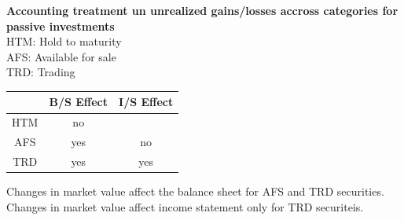 \textbf{Accounting treatment un unrealized gains/losses accross categories for passive investments}
\\
HTM: Hold to maturity \\
AFS: Available for sale \\
TRD: Trading \\
\begin{center}
	\begin{tabular}{ |c|c|c| } 
		\hline
			  & B/S Effect & I/S Effect \\ 
		\hline
		HTM & no &  \\ 
		AFS & yes & no \\ 
		TRD & yes & yes \\ 
		\hline
	\end{tabular}
\end{center}

Changes in market value affect the balance sheet for AFS and TRD securities. Changes in market value affect income statement only for TRD securiteis.